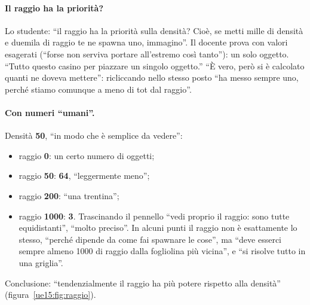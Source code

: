 \paragraph{Il raggio ha la priorità?} Lo studente: ``il raggio ha la priorità sulla densità?
Cioè, se metti mille di densità e duemila di raggio te ne spawna uno, immagino''. Il docente
prova con valori esagerati (``forse non serviva portare all'estremo così tanto''): un solo
oggetto. ``Tutto questo casino per piazzare un singolo oggetto.'' ``È vero, però si è calcolato
quanti ne doveva mettere'': ricliccando nello stesso posto ``ha messo sempre uno, perché stiamo
comunque a meno di tot dal raggio''.

\paragraph{Con numeri ``umani''.} Densità \textbf{50}, ``in modo che è semplice da vedere'':
\begin{itemize}
  \item raggio \textbf{0}: un certo numero di oggetti;
  \item raggio \textbf{50}: \textbf{64}, ``leggermente meno'';
  \item raggio \textbf{200}: ``una trentina'';
  \item raggio \textbf{1000}: \textbf{3}. Trascinando il pennello ``vedi proprio il raggio:
        sono tutte equidistanti'', ``molto preciso''. In alcuni punti il raggio non è
        esattamente lo stesso, ``perché dipende da come fai spawnare le cose'', ma ``deve
        esserci sempre almeno 1000 di raggio dalla fogliolina più vicina'', e ``si risolve
        tutto in una griglia''.
\end{itemize}
Conclusione: ``tendenzialmente il raggio ha più potere rispetto alla densità''
(figura~\ref{ue15:fig:raggio}).

